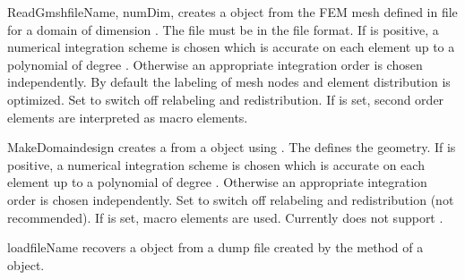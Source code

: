\begin{funcdesc}{ReadGmsh}{fileName, numDim, }
creates a \Domain object from the FEM mesh defined in file  for
a domain of dimension .
The file must be in the \gmshextern file format.
If  is positive, a numerical integration scheme is chosen
which is accurate on each element up to a polynomial of degree
.
Otherwise an appropriate integration order is chosen independently.
By default the labeling of mesh nodes and element distribution is optimized.
Set  to switch off relabeling and redistribution.
If  is set, second order elements are interpreted as
macro elements.
\end{funcdesc}

\begin{funcdesc}{MakeDomain}{design}
creates a \finley \Domain from a \pycad {} object using \gmshextern.
The   defines the geometry.
If  is positive, a numerical integration scheme is chosen
which is accurate on each element up to a polynomial of degree
.
Otherwise an appropriate integration order is chosen independently.
Set  to switch off relabeling and redistribution
(not recommended).
If  is set, macro elements are used.
Currently  does not support \MPI.
\end{funcdesc}

\begin{funcdesc}{load}{fileName}
recovers a \Domain object from a dump file  created by the
 method of a \Domain object.
\end{funcdesc}

